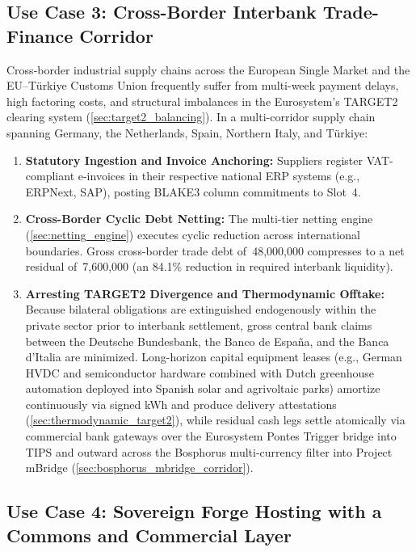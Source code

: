 \documentclass[a4paper,11pt,twoside,parskip=half-,headings=small]{scrartcl}
\newcommand{\EUR}[1]{\texteuro\,#1}
\begin{document}
\subsection{Use Case 3: Cross-Border Interbank Trade-Finance Corridor}

Cross-border industrial supply chains across the European Single Market and the EU--T\"urkiye Customs Union frequently suffer
from multi-week payment delays, high factoring costs, and structural imbalances in the
Eurosystem's TARGET2 clearing system (\cref{sec:target2_balancing}). In a multi-corridor supply chain spanning Germany, the Netherlands, Spain, Northern Italy, and T\"urkiye:
\begin{enumerate}
  \item \textbf{Statutory Ingestion and Invoice Anchoring:} Suppliers register VAT-compliant
e-invoices in their respective national ERP systems (e.g., ERPNext, SAP), posting BLAKE3
column commitments to Slot~4.
  \item \textbf{Cross-Border Cyclic Debt Netting:} The multi-tier netting engine
(\cref{sec:netting_engine}) executes cyclic reduction across international boundaries.
Gross cross-border trade debt of \EUR{48,000,000} compresses to a net residual of
\EUR{7,600,000} (an 84.1\% reduction in required interbank liquidity).
  \item \textbf{Arresting TARGET2 Divergence and Thermodynamic Offtake:} Because bilateral obligations are extinguished
endogenously within the private sector prior to interbank settlement, gross central bank
claims between the Deutsche Bundesbank, the Banco de Espa\~na, and the Banca d'Italia are minimized. Long-horizon capital equipment leases (e.g., German HVDC and semiconductor hardware combined with Dutch greenhouse automation deployed into Spanish solar and agrivoltaic parks) amortize continuously via signed kWh and produce delivery attestations (\cref{sec:thermodynamic_target2}), while residual cash legs settle atomically via commercial bank gateways over the Eurosystem Pontes Trigger bridge into TIPS and outward across the Bosphorus multi-currency filter into Project mBridge (\cref{sec:bosphorus_mbridge_corridor}).
\end{enumerate}

\subsection{Use Case 4: Sovereign Forge Hosting with a Commons and Commercial Layer}
\end{document}
